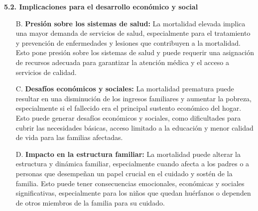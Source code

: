 \documentclass[8pt,a4paper]{beamer}
\begin{document}
{\begin{frame}{}
\begin{block}{\textbf{5.2. Implicaciones para el desarrollo económico y social}}
\begin{enumerate}
\item[B.] \textbf{Presión sobre los sistemas de salud:} La mortalidad elevada implica una mayor demanda de servicios de salud, especialmente para el tratamiento y prevención de enfermedades y lesiones que contribuyen a la mortalidad. Esto pone presión sobre los sistemas de salud y puede requerir una asignación de recursos adecuada para garantizar la atención médica y el acceso a servicios de calidad.

\end{enumerate}
\end{block}
\end{frame}

\begin{frame}{}
\setlength{\parskip}{3px}
\justifying
\begin{block}{}
\setlength{\parskip}{3px}
\justifying
\begin{enumerate}
\setlength{\parskip}{3px}
\justifying
\item[C.] \textbf{Desafíos económicos y sociales:} La mortalidad prematura puede resultar en una disminución de los ingresos familiares y aumentar la pobreza, especialmente si el fallecido era el principal sustento económico del hogar. Esto puede generar desafíos económicos y sociales, como dificultades para cubrir las necesidades básicas, acceso limitado a la educación y menor calidad de vida para las familias afectadas.

\item[D.] \textbf{Impacto en la estructura familiar:} La mortalidad puede alterar la estructura y dinámica familiar, especialmente cuando afecta a los padres o a personas que desempeñan un papel crucial en el cuidado y sostén de la familia. Esto puede tener consecuencias emocionales, económicas y sociales significativas, especialmente para los niños que quedan huérfanos o dependen de otros miembros de la familia para su cuidado.

\end{enumerate}
\end{block}
\end{frame}


}
\end{document}
